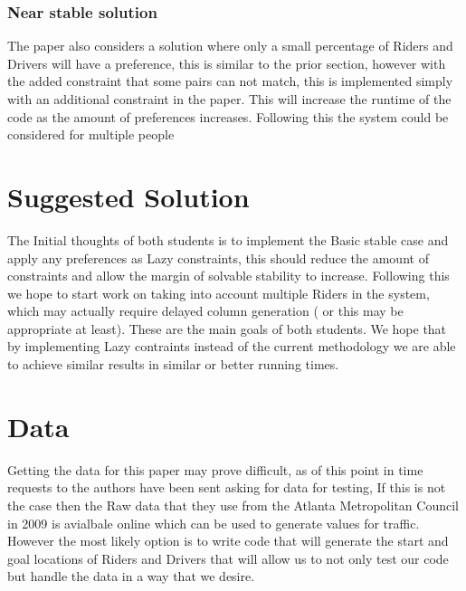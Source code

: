 \documentclass[]{report}
\begin{document}
\subsubsection*{Near stable solution}
The paper also considers a solution where only a small percentage of Riders and Drivers will have a preference, this is similar to the prior section, however with the added constraint that some pairs can not match, this is implemented simply with an additional constraint in the paper. This will increase the runtime of the code as the amount of preferences increases. Following this the system could be considered for multiple people

\section*{Suggested Solution}
The Initial thoughts of both students is to implement the Basic stable case and apply any preferences as Lazy constraints, this should reduce the amount of constraints and allow the margin of solvable stability to increase. Following this we hope to start work on taking into account multiple Riders in the system, which may actually require delayed column generation ( or this may be appropriate at least). These are the main goals of both students. We hope that by implementing Lazy contraints instead of the current methodology we are able to achieve similar results in similar or better running times. 

\section*{Data}
Getting the data for this paper may prove difficult, as of this point in time requests to the authors have been sent asking for data for testing, If this is not the case then the Raw data that they use from the Atlanta Metropolitan Council in 2009 is avialbale online which can be used to generate values for traffic. However the most likely option is to write code that will generate the start and goal locations of Riders and Drivers that will allow us to not only test our code but handle the data in a way that we desire. 
\end{document}
